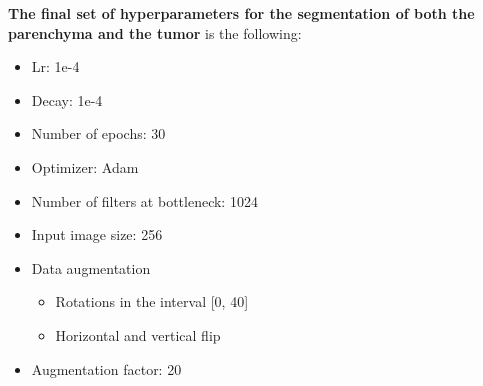 \textbf{The final set of hyperparameters for the segmentation of both
the parenchyma and the tumor} is the following:

\begin{itemize}
\item
  Lr: 1e-4
\item
  Decay: 1e-4
\item
  Number of epochs: 30
\item
  Optimizer: Adam
\item
  Number of filters at bottleneck: 1024
\item
  Input image size: 256
\item
  Data augmentation
  \begin{itemize}
  \item
    Rotations in the interval {[}0, 40{]}
  \item
    Horizontal and vertical flip
  \end{itemize}
\item
  Augmentation factor: 20
\end{itemize}


\renewcommand{\arraystretch}{5}
